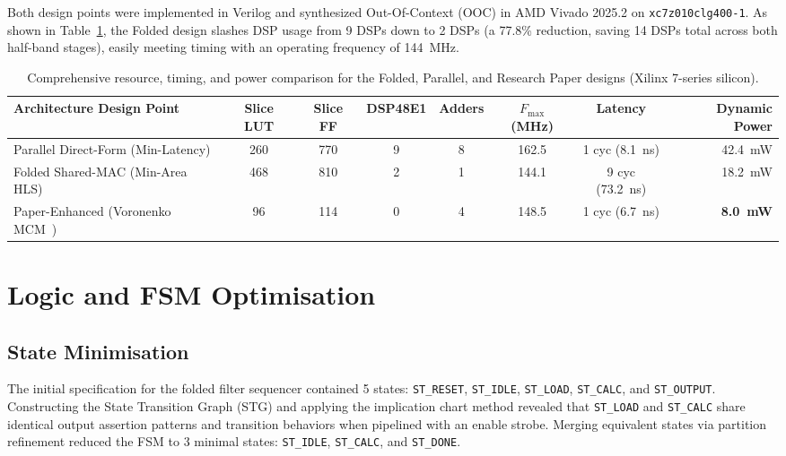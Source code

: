 \documentclass[11pt,a4paper]{article}
\begin{document}
Both design points were implemented in Verilog and synthesized Out-Of-Context (OOC) in AMD Vivado 2025.2 on \texttt{xc7z010clg400-1}. As shown in Table~\ref{tab:designpoints}, the Folded design slashes DSP usage from 9 DSPs down to 2 DSPs (a 77.8\% reduction, saving 14 DSPs total across both half-band stages), easily meeting timing with an operating frequency of 144~MHz.

\begin{table}[H]\centering\small
\caption{Comprehensive resource, timing, and power comparison for the Folded, Parallel, and Research Paper designs (Xilinx 7-series silicon).}\label{tab:designpoints}
\begin{tabular}{@{}lccccccr@{}}
\toprule
Architecture Design Point & Slice LUT & Slice FF & DSP48E1 & Adders & $F_{\text{max}}$ (MHz) & Latency & Dynamic Power\\
\midrule
Parallel Direct-Form (Min-Latency)  & 260 & 770 & 9 & 8 & 162.5 & 1 cyc (8.1~ns) & 42.4~mW\\
Folded Shared-MAC (Min-Area HLS)    & 468 & 810 & 2 & 1 & 144.1 & 9 cyc (73.2~ns) & 18.2~mW\\
Paper-Enhanced (Voronenko MCM~\cite{voronenko2007}) & 96 & 114 & 0 & 4 & 148.5 & 1 cyc (6.7~ns) & \textbf{8.0~mW}\\
\bottomrule
\end{tabular}
\end{table}

\section{Logic and FSM Optimisation}
\label{sec:logic}

\subsection{State Minimisation}
The initial specification for the folded filter sequencer contained 5 states: \texttt{ST\_RESET}, \texttt{ST\_IDLE}, \texttt{ST\_LOAD}, \texttt{ST\_CALC}, and \texttt{ST\_OUTPUT}. Constructing the State Transition Graph (STG) and applying the implication chart method revealed that \texttt{ST\_LOAD} and \texttt{ST\_CALC} share identical output assertion patterns and transition behaviors when pipelined with an enable strobe. Merging equivalent states via partition refinement reduced the FSM to 3 minimal states: \texttt{ST\_IDLE}, \texttt{ST\_CALC}, and \texttt{ST\_DONE}.
\end{document}
